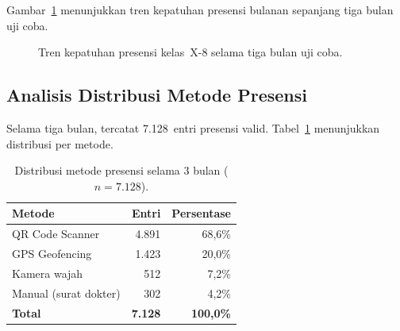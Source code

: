 \documentclass[12pt,a4paper]{article}
\newcommand{\sistem}{\textit{SiAbsensi}}
\begin{document}
Gambar~\ref{fig:tren} menunjukkan tren kepatuhan presensi bulanan
sepanjang tiga bulan uji coba.

\begin{figure}[htbp]
\centering
{}
\caption{Tren kepatuhan presensi kelas~X-8 selama tiga bulan uji coba.}
\label{fig:tren}
\end{figure}

\subsection{Analisis Distribusi Metode Presensi}

Selama tiga bulan, tercatat 7.128~entri presensi valid.
Tabel~\ref{tab:metode} menunjukkan distribusi per metode.

\begin{table}[htbp]
\centering
\caption{Distribusi metode presensi selama 3 bulan ($n=7{.}128$).}
\label{tab:metode}
\small
\renewcommand{\arraystretch}{1.15}
\begin{tabular}{lrr}
\toprule
\textbf{Metode} & \textbf{Entri} & \textbf{Persentase} \\
\midrule
QR Code Scanner       & 4.891 & 68,6\% \\
GPS Geofencing        & 1.423 & 20,0\% \\
Kamera wajah          &   512 &  7,2\% \\
Manual (surat dokter) &   302 &  4,2\% \\
\midrule
\textbf{Total}        & \textbf{7.128} & \textbf{100,0\%} \\
\bottomrule
\end{tabular}
\end{table}
\end{document}
